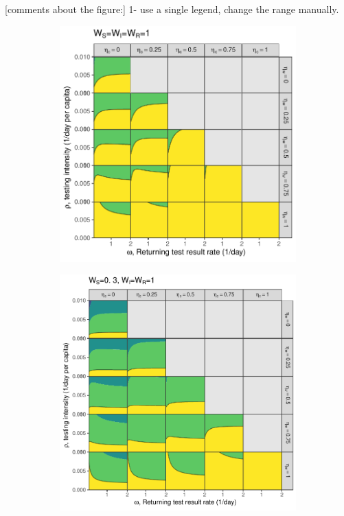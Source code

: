 \documentclass[12pt]{article}
\theoremstyle{definition} %
\begin{document}
[comments about the figure:]
1- use a single legend, change the range manually.
\begin{figure}[h!]
\centering
\begin{subfigure}[t]{.45\textwidth}
\centering
\includegraphics[width=\linewidth]{./pix/R0contour_random.pdf}
\caption{}\label{p.a}
\end{subfigure}
%
\begin{subfigure}[t]{.45\textwidth}
\centering
\includegraphics[width=\linewidth]{./pix/R0contour_TTI.pdf}

\end{subfigure}
\end{figure}
\end{document}
